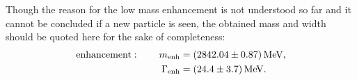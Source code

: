 Though the reason for the low mass enhancement is not understood so far and it cannot be concluded if a new particle is seen, the obtained mass and width should be quoted here for the sake of completeness:
\begin{align*}
    \text{enhancement}: \qquad  m_{\text{enh}} &= (2842.04 \pm 0.87) \mathrm{\,Me\kern -0.1em V}, \\
                                \Gamma_{\text{enh}}   &= (24.4 \pm 3.7) \mathrm{\,Me\kern -0.1em V}.
\end{align*}
